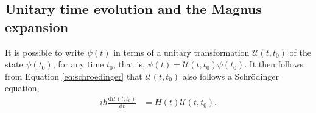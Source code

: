 \documentclass{jors}
\begin{document}


	
	\subsection{Unitary time evolution and the Magnus expansion}
		It is possible to write \(\psi(t)\) in terms of a unitary transformation \(\mathcal{U}(t, t_0)\) of the state \(\psi(t_0)\), for any time \(t_0\), that is, \(\psi(t) = \mathcal{U}(t, t_0)\psi(t_0)\).
		It then follows from Equation \eqref{eq:schroedinger} that \(\mathcal{U}(t, t_0)\) also follows a Schr\"{o}dinger equation,
		\begin{align}
			i\hbar\frac{\mathrm{d}\mathcal{U}(t, t_0)}{\mathrm{d}t} &= H(t)\mathcal{U}(t, t_0).\label{eq:unitary_schroedinger}
		\end{align}
\end{document}
